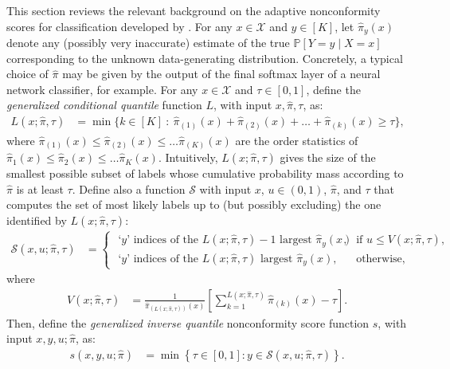 This section reviews the relevant background on the adaptive nonconformity scores for classification developed by \citet{romano2020classification}.
For any $x \in \mathcal{X}$ and $y \in [K]$, let $\hat{\pi}_{y}(x)$ denote any (possibly very inaccurate) estimate of the true $\mathbb{P}[ Y = y \mid X =x]$ corresponding to the unknown data-generating distribution. Concretely, a typical choice of $\hat{\pi}$ may be given by the output of the final softmax layer of a neural network classifier, for example.
 For any $x \in \mathcal{X}$ and $\tau \in [0,1]$, define the \emph{generalized conditional quantile} function $L$, with input $x, \hat{\pi}, \tau$, as:
\begin{align} \label{eq:oracle-threshold}
  L(x; \hat{\pi}, \tau) & = \min \{ k \in [K] \ : \ \hat{\pi}_{(1)}(x) + \hat{\pi}_{(2)}(x) + \ldots + \hat{\pi}_{(k)}(x) \geq \tau \},
  \end{align}
where $\hat{\pi}_{(1)}(x) \leq \hat{\pi}_{(2)}(x) \leq \ldots \hat{\pi}_{(K)}(x)$ are the order statistics of $\hat{\pi}_{1}(x) \leq \hat{\pi}_{2}(x) \leq \ldots \hat{\pi}_{K}(x)$.
Intuitively, $L(x; \hat{\pi}, \tau)$ gives the size of the smallest possible subset of labels whose cumulative probability mass according to $\hat{\pi}$ is at least $\tau$.
Define also a function $\mathcal{S}$ with input $x$, $u \in (0,1)$, $\hat{\pi}$, and $\tau$ that computes the set of most likely labels up to (but possibly excluding) the one identified by $L(x; \hat{\pi}, \tau)$:
\begin{align} \label{eq:define-S}
    \mathcal{S}(x, u ; \hat{\pi}, \tau) & =
    \begin{cases}
    \text{ `$y$' indices of the $L(x ; \hat{\pi},\tau)-1$ largest $\hat{\pi}_{y}(x)$},
    & \text{ if } u \leq V(x ; \hat{\pi},\tau) , \\
    \text{ `$y$' indices of the $L(x ; \hat{\pi},\tau)$ largest $\hat{\pi}_{y}(x)$},
    & \text{ otherwise},
    \end{cases}
\end{align}
where
\begin{align*}
    V(x; \hat{\pi}, \tau) & =  \frac{1}{\hat{\pi}_{(L(x ; \hat{\pi}, \tau))}(x)} \left[\sum_{k=1}^{L(x ; \hat{\pi}, \tau)} \hat{\pi}_{(k)}(x) - \tau \right].
\end{align*}
Then, define the \textit{generalized inverse quantile} nonconformity score function $s$, with input $x,y,u;\hat{\pi}$, as:
\begin{align} \label{eq:define-scores}
    s(x,y,u;\hat{\pi}) & = \min \left\{ \tau \in [0,1] : y \in \mathcal{S}(x, u ; \hat{\pi}, \tau) \right\}.
\end{align}
